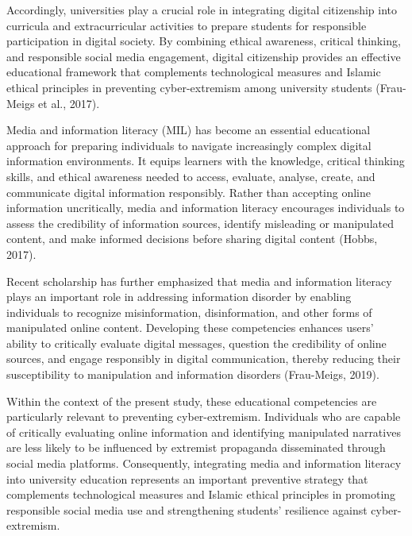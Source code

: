 \documentclass{NSP1}
\begin{document}
Accordingly, universities play a crucial role in integrating digital citizenship into curricula and extracurricular activities to prepare students for responsible participation in digital society. By combining ethical awareness, critical thinking, and responsible social media engagement, digital citizenship provides an effective educational framework that complements technological measures and Islamic ethical principles in preventing cyber-extremism among university students (Frau-Meigs et al., 2017).

\par\medskip{}\smallskip

Media and information literacy (MIL) has become an essential educational approach for preparing individuals to navigate increasingly complex digital information environments. It equips learners with the knowledge, critical thinking skills, and ethical awareness needed to access, evaluate, analyse, create, and communicate digital information responsibly. Rather than accepting online information uncritically, media and information literacy encourages individuals to assess the credibility of information sources, identify misleading or manipulated content, and make informed decisions before sharing digital content (Hobbs, 2017).

Recent scholarship has further emphasized that media and information literacy plays an important role in addressing information disorder by enabling individuals to recognize misinformation, disinformation, and other forms of manipulated online content. Developing these competencies enhances users' ability to critically evaluate digital messages, question the credibility of online sources, and engage responsibly in digital communication, thereby reducing their susceptibility to manipulation and information disorders (Frau-Meigs, 2019).

Within the context of the present study, these educational competencies are particularly relevant to preventing cyber-extremism. Individuals who are capable of critically evaluating online information and identifying manipulated narratives are less likely to be influenced by extremist propaganda disseminated through social media platforms. Consequently, integrating media and information literacy into university education represents an important preventive strategy that complements technological measures and Islamic ethical principles in promoting responsible social media use and strengthening students' resilience against cyber-extremism.
\end{document}
